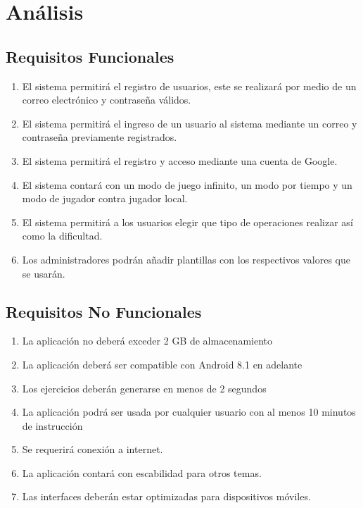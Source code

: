 \documentclass{article}
\begin{document}
\section{Análisis}
\subsection{Requisitos Funcionales}
\begin{enumerate}
\item {El sistema permitirá el registro de usuarios, este se realizará por medio de un correo electrónico y contraseña válidos.}
\item{El sistema permitirá el ingreso de un usuario al sistema mediante un correo y contraseña  previamente registrados.}
\item {El sistema permitirá el registro y acceso mediante una cuenta de Google.}
\item {El sistema contará con un modo de juego infinito, un modo por tiempo y un modo de jugador contra jugador local.}
\item{El sistema permitirá a los usuarios elegir que tipo de operaciones realizar así como la dificultad.}
\item{Los administradores podrán añadir plantillas con los respectivos valores que se usarán.}
\end{enumerate}
\subsection{Requisitos No Funcionales}
\begin{enumerate}
\item {La aplicación no deberá exceder 2 GB de almacenamiento}
\item {La aplicación deberá ser compatible con Android 8.1 en adelante}
\item {Los ejercicios deberán generarse en menos de 2 segundos}
\item {La aplicación podrá ser usada por cualquier usuario con al menos 10 minutos de instrucción}
\item {Se requerirá conexión a internet.}
\item {La aplicación contará con escabilidad para otros temas.}
\item {Las interfaces deberán estar optimizadas para dispositivos móviles.}
\end{enumerate}
\end{document}
